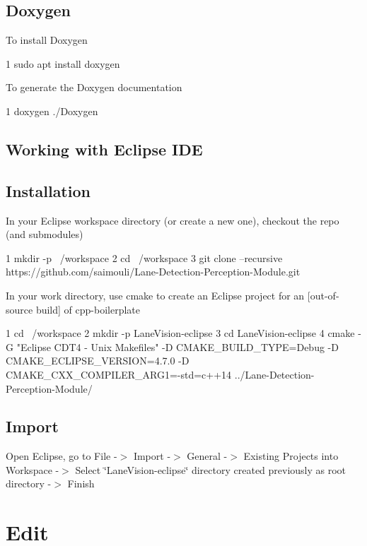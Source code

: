 \subsection*{Doxygen}

To install Doxygen 
\begin{DoxyCode}
1 sudo apt install doxygen
\end{DoxyCode}
 To generate the Doxygen documentation 
\begin{DoxyCode}
1 doxygen ./Doxygen
\end{DoxyCode}


\subsection*{Working with Eclipse I\+DE}

\subsection*{Installation}

In your Eclipse workspace directory (or create a new one), checkout the repo (and submodules) 
\begin{DoxyCode}
1 mkdir -p ~/workspace
2 cd ~/workspace
3 git clone --recursive https://github.com/saimouli/Lane-Detection-Perception-Module.git
\end{DoxyCode}


In your work directory, use cmake to create an Eclipse project for an \mbox{[}out-\/of-\/source build\mbox{]} of cpp-\/boilerplate


\begin{DoxyCode}
1 cd ~/workspace
2 mkdir -p LaneVision-eclipse
3 cd LaneVision-eclipse
4 cmake -G "Eclipse CDT4 - Unix Makefiles" -D CMAKE\_BUILD\_TYPE=Debug -D CMAKE\_ECLIPSE\_VERSION=4.7.0 -D
       CMAKE\_CXX\_COMPILER\_ARG1=-std=c++14 ../Lane-Detection-Perception-Module/
\end{DoxyCode}
 \subsection*{Import}

Open Eclipse, go to File -\/$>$ Import -\/$>$ General -\/$>$ Existing Projects into Workspace -\/$>$ Select \char`\"{}\+Lane\+Vision-\/eclipse\char`\"{} directory created previously as root directory -\/$>$ Finish

\section*{Edit}

